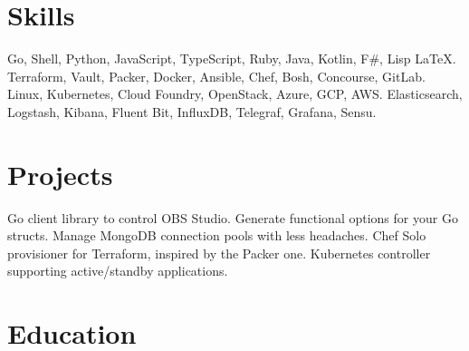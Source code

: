 \documentclass[10pt,letterpaper,sans]{moderncv} %
\begin{document}
\section{Skills}
  {Go, Shell, Python, JavaScript, TypeScript, Ruby, Java, Kotlin, F\#, Lisp \LaTeX. \yeahigotsweskills}
  {Terraform, Vault, Packer, Docker, Ansible, Chef, Bosh, Concourse, GitLab.}
  {Linux, Kubernetes, Cloud Foundry, OpenStack, Azure, GCP, AWS. \yeahigotsreskills}
  {Elasticsearch, Logstash, Kibana, Fluent Bit, InfluxDB, Telegraf, Grafana, Sensu.}

\section{Projects}
  {Go client library to control OBS Studio.}
  {Generate functional options for your Go structs.}
  {Manage MongoDB connection pools with less headaches.}
  {Chef Solo provisioner for Terraform, inspired by the Packer one.}
  {Kubernetes controller supporting active/standby applications.}

\section{Education}
\end{document}
